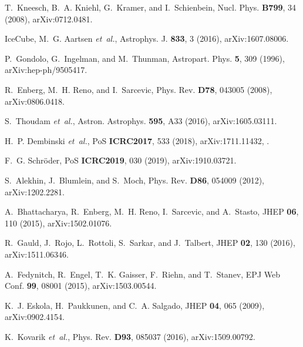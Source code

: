\documentclass[12pt]{article}
\begin{document}
\begin{thebibliography}{99}
T.~Kneesch, B.~A. Kniehl, G.~Kramer, and I.~Schienbein,
\newblock Nucl. Phys. {\bf B799}, 34 (2008), arXiv:0712.0481.

IceCube, M.~G. Aartsen {\em et~al.},
\newblock Astrophys. J. {\bf 833}, 3 (2016), arXiv:1607.08006.

P.~Gondolo, G.~Ingelman, and M.~Thunman,
\newblock Astropart. Phys. {\bf 5}, 309 (1996), arXiv:hep-ph/9505417.

R.~Enberg, M.~H. Reno, and I.~Sarcevic,
\newblock Phys. Rev. {\bf D78}, 043005 (2008), arXiv:0806.0418.

S.~Thoudam {\em et~al.},
\newblock Astron. Astrophys. {\bf 595}, A33 (2016), arXiv:1605.03111.

H.~P. Dembinski {\em et~al.},
\newblock PoS {\bf ICRC2017}, 533 (2018), arXiv:1711.11432,
\newblock [35,533(2017)].

F.~G. Schr{\"o}der,
\newblock PoS {\bf ICRC2019}, 030 (2019), arXiv:1910.03721.

S.~Alekhin, J.~Blumlein, and S.~Moch,
\newblock Phys. Rev. {\bf D86}, 054009 (2012), arXiv:1202.2281.

A.~Bhattacharya, R.~Enberg, M.~H. Reno, I.~Sarcevic, and A.~Stasto,
\newblock JHEP {\bf 06}, 110 (2015), arXiv:1502.01076.

R.~Gauld, J.~Rojo, L.~Rottoli, S.~Sarkar, and J.~Talbert,
\newblock JHEP {\bf 02}, 130 (2016), arXiv:1511.06346.

A.~Fedynitch, R.~Engel, T.~K. Gaisser, F.~Riehn, and T.~Stanev,
\newblock EPJ Web Conf. {\bf 99}, 08001 (2015), arXiv:1503.00544.

K.~J. Eskola, H.~Paukkunen, and C.~A. Salgado,
\newblock JHEP {\bf 04}, 065 (2009), arXiv:0902.4154.

K.~Kovarik {\em et~al.},
\newblock Phys. Rev. {\bf D93}, 085037 (2016), arXiv:1509.00792.





\end{thebibliography}
\end{document}
